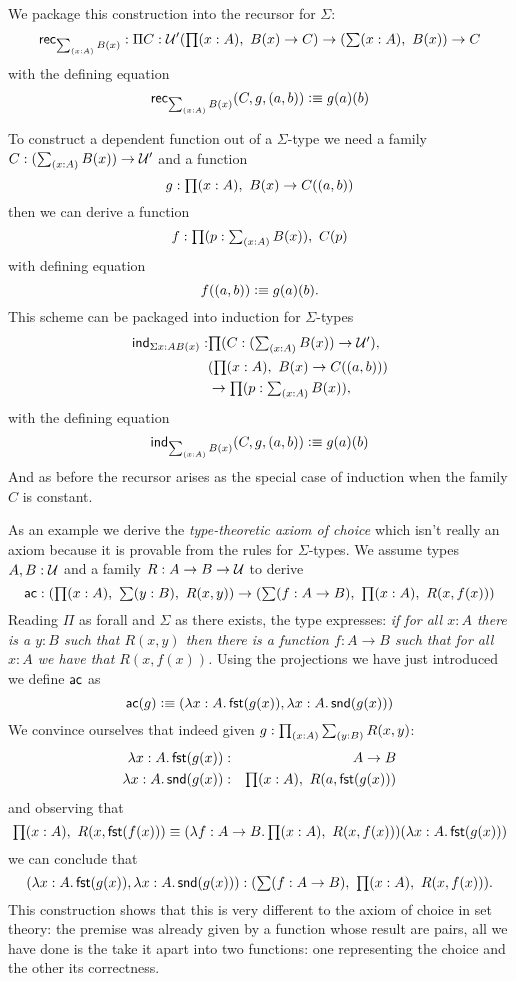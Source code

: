 We package this construction into the recursor for $\Sigma$:
\[ \rec{\sm{x:A}B(x)} : \Pi{C:\UU'}(\prd{x:A} B(x) \to C) \to
(\sm{x:A}B(x)) \to C \]
with the defining equation
\[ \rec{\sm{x:A}B(x)}(C,g,\tup{a}{b}) \defeq g(a)(b) \]

To construct a dependent function out of a $\Sigma$-type we 
need a family $C : (\sm{x:A} B(x)) \to \UU'$ and a function
\[ g : \prd{x:A} B(x) \to C(\tup{a}{b}) \]
then we can derive a function 
\[ f : \prd{p : \sm{x:A}B(x)} C(p) \]
with  defining equation
\[ f(( a,b)) \vcentcolon\equiv g(a)(b).\]
This scheme can be packaged into induction for $\Sigma$-types
\begin{align*}
  \ind{\Sigma{x:A}B(x)} : & \prd{C:(\sm{x:A} B(x)) \to \UU'}\\
   & (\prd{x:A} B(x) \to C(\tup{a}{b})) \\
   & \to \prd{p : \sm{x:A}B(x)}
\end{align*}
with the defining equation 
\[ \ind{\sm{x:A}B(x)}(C,g,\tup{a}{b}) \defeq g(a)(b) \]
And as before the recursor arises as the special case of induction
when the family $C$ is constant.

As an example we derive the \emph{type-theoretic axiom of choice}
which isn't really an axiom because it is provable from the rules
for $\Sigma$-types. We assume types $A,B : \mathcal{U}$ and a 
family $R : A \to B \to \mathcal{U}$ to derive
\[ \ac : (\prd{x:A} \sm{y :B} R(x,y)) \to (\sm{f:A\to B}
\prd{x:A} R(x,f(x))) \]
Reading $\Pi$ as forall and $\Sigma$ as there exists, the type
expresses: \emph{if for all $x:A$ there is a $y:B$ such that
  $R(x,y)$ then there is a function $f : A \to B$ such that for
  all $x:A$ we have that $R(x,f(x))$.} Using the projections we have
just introduced we define $\mathsf{ac}$ as
\[ \ac(g) \defeq \tup{\lam{x:A} \fst(g(x))}{\lam{x:A} \snd(g(x))} \]
We convince ourselves that indeed given $g:\prd{x:A} \sm{y :B}
R(x,y)$:
\begin{eqnarray*}
\lam{x:A} \fst(g(x)) & : &  A \to  B \\
\lam{x:A} \snd(g(x)) & : &  \prd{x:A} R(a,\fst(g(x))) 
\end{eqnarray*}
and observing that 
\[ \prd{x:A} R(x,\fst(f(x))) \jdeq (\lam{f:A\to B} \prd{x:A}
R(x,f(x)))(\lam{x:A} \fst(g(x))) \]
we can conclude that
\[ \tup{\lam{x:A} \fst(g(x))}{\lam{x:A} \snd(g(x))} : (\sm{f:A\to B}
\prd{x:A} R(x,f(x))) .\]
This construction shows that this is very different to the axiom
of choice in set theory: the premise was already given by a
function whose result are pairs, all we have done is the take it apart into two
functions: one representing the choice and the other its correctness.

